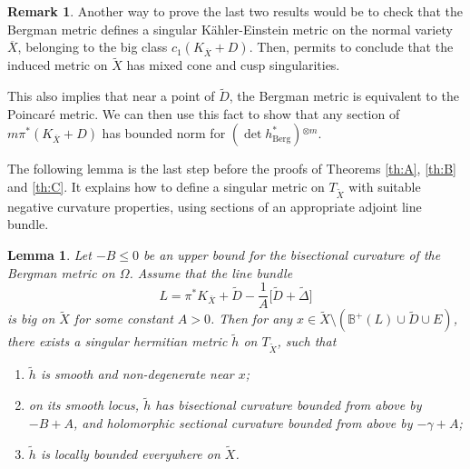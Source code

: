 \documentclass[JEP,XML,SOM,Unicode]{cedram}
\theoremstyle{plain}
\newtheorem{lemma}[theorem]{Lemma}
\theoremstyle{definition}
\newtheorem{remark}[theorem]{Remark}
\numberwithin{equation}{theorem}
\newenvironment{enumerateth}
{\bgroup\def\theenumi{\thetheorem.\arabic{enumi}}
\begin{enumerate}
\setcounter{enumi}{\value{equation}}}
{\setcounter{equation}{\value{enumi}}
\end{enumerate}
\egroup}
\begin{document}
\begin{remark}
Another way to prove the last two results would be to check that the Bergman metric defines a singular Kähler-Einstein metric on the normal variety~$\overline{X}$, belonging to the big class $c_1(K_{\overline{X}} + D)$. Then, \cite[Prop.\,2, Th.\,3]{GP16} permits to conclude that the induced metric on $\widetilde{X}$ has mixed cone and cusp singularities.

This also implies that near a point of $\widetilde{D}$, the Bergman metric is equivalent to the Poincaré metric. We can then use this fact to show that any section of $m \pi^\ast (K_{\overline{X}} + D)$ has bounded norm for $(\det h_{\mathrm{Berg}}^\ast ){}^{\otimes m}$.
\end{remark}

The following lemma is the last step before the proofs of Theorems \ref{th:A}, \ref{th:B} and \ref{th:C}. It explains how to define a singular metric on $T_{\widetilde{X}}$ with suitable negative curvature properties, using sections of an appropriate adjoint line bundle.

\begin{lemma} \label{lemcritere} Let $- B \leq 0$ be an upper bound for the bisectional curvature of the Bergman metric on $\Omega$. Assume that the line bundle
$$
L = \pi^\ast K_{\overline{X}} + \widetilde{D} - \frac{1}{A} \bigl[ \widetilde{D} + \widetilde{\Delta} \bigr]
$$
is big on $\widetilde{X}$ for some constant $A > 0$. Then for any $x \in \widetilde{X} \setminus( \mathbb B^+(L) \cup \widetilde{D} \cup E)$, there exists a singular hermitian metric $\widetilde{h}$ on $T_{\widetilde{X}}$, such that
\begin{enumerateth}
\item $\widetilde{h}$ is smooth and non-degenerate near $x$;
\item on its smooth locus, $\widetilde{h}$ has bisectional curvature bounded from above by $- B + A$, and holomorphic sectional curvature bounded from above by $- \gamma + A$;
\item $\widetilde{h}$ is locally bounded everywhere on $\widetilde{X}$.
\end{enumerateth}
\end{lemma}
\end{document}

